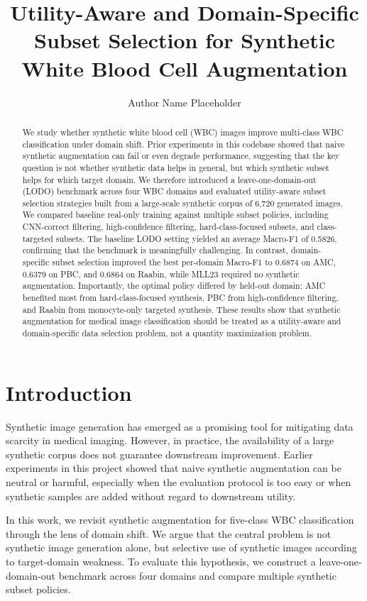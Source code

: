 \documentclass[11pt]{article}
\title{Utility-Aware and Domain-Specific Subset Selection for Synthetic White Blood Cell Augmentation}
\author{Author Name Placeholder}
\date{}
\begin{document}
\maketitle

\begin{abstract}
We study whether synthetic white blood cell (WBC) images improve multi-class WBC classification under domain shift. Prior experiments in this codebase showed that naive synthetic augmentation can fail or even degrade performance, suggesting that the key question is not whether synthetic data helps in general, but which synthetic subset helps for which target domain. We therefore introduced a leave-one-domain-out (LODO) benchmark across four WBC domains and evaluated utility-aware subset selection strategies built from a large-scale synthetic corpus of 6,720 generated images. We compared baseline real-only training against multiple subset policies, including CNN-correct filtering, high-confidence filtering, hard-class-focused subsets, and class-targeted subsets. The baseline LODO setting yielded an average Macro-F1 of 0.5826, confirming that the benchmark is meaningfully challenging. In contrast, domain-specific subset selection improved the best per-domain Macro-F1 to 0.6874 on AMC, 0.6379 on PBC, and 0.6864 on Raabin, while MLL23 required no synthetic augmentation. Importantly, the optimal policy differed by held-out domain: AMC benefited most from hard-class-focused synthesis, PBC from high-confidence filtering, and Raabin from monocyte-only targeted synthesis. These results show that synthetic augmentation for medical image classification should be treated as a utility-aware and domain-specific data selection problem, not a quantity maximization problem.
\end{abstract}

\section{Introduction}

Synthetic image generation has emerged as a promising tool for mitigating data scarcity in medical imaging. However, in practice, the availability of a large synthetic corpus does not guarantee downstream improvement. Earlier experiments in this project showed that naive synthetic augmentation can be neutral or harmful, especially when the evaluation protocol is too easy or when synthetic samples are added without regard to downstream utility.

In this work, we revisit synthetic augmentation for five-class WBC classification through the lens of domain shift. We argue that the central problem is not synthetic image generation alone, but selective use of synthetic images according to target-domain weakness. To evaluate this hypothesis, we construct a leave-one-domain-out benchmark across four domains and compare multiple synthetic subset policies.
\end{document}
